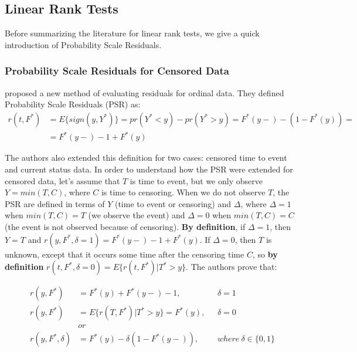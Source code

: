 \documentclass[]{article}
\begin{document}

\subsection{Linear Rank Tests}
Before summarizing the literature for linear rank tests, we give a quick introduction of Probability Scale Residuals.

\subsubsection{Probability Scale Residuals for Censored Data}

\cite{li2012new} proposed a new method of evaluating residuals for ordinal data. They defined Probability Scale Residuals (PSR) as:\\
$$
\begin{aligned}
	r(t,F^*) &= E\{sign(y,Y^*)\} = pr(Y^* < y) - pr(Y^* > y) = F^*(y-) - (1-F^*(y)) =\\
	 &=F^*(y-) - 1 + F^*(y)
	\end{aligned}
$$

The authors also extended this definition for two cases: censored time to event and current status data. In order to understand how the PSR were extended for censored data, let's assume that $T$ is time to event, but we only observe $Y = min(T, C)$, where $C$ is time to censoring. When we do not observe $T$, the PSR are defined in terms of $Y$ (time to event or censoring) and $\Delta$, where $\Delta = 1$ when $min(T, C)=T$ (we observe the event) and $\Delta =0$ when $min(T, C)=C$ (the event is not observed because of censoring). \textbf{By definition}, if $\Delta = 1$, then $Y=T$ and $r(y,F^*, \delta=1) = F^*(y-) - 1 + F^*(y)$. If $\Delta = 0$, then $T$ is unknown, except that it occurs some time after the censoring time $C$, so \textbf{by definition} $r(t,F^*, \delta=0) = E\{r(t,F^*)|T^*>y\}$. The authors prove that:

	$$
	\begin{aligned}
		r(y, F^*) &= F^*(y) + F^*(y-) - 1,~~~&\delta = 1 \\
		r(y, F^*) &= E\{r(T,F^*)|T^*>y\} = F^*(y) ,~~~&\delta = 0 \\
		&or\\
    r(y, F^*, \delta) &= F^*(y) - \delta(1 - F^*(y-)),~~~&where~\delta \in \{0,1\}
	\end{aligned}
	$$
\end{document}
